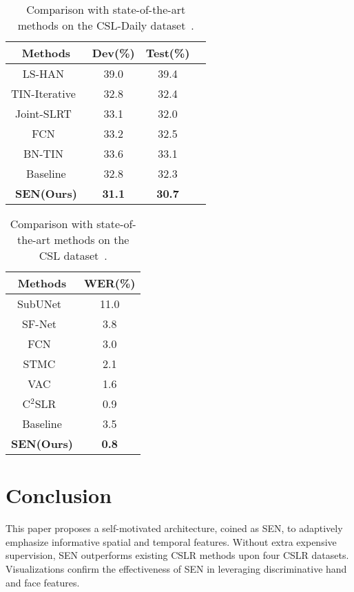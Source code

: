 \documentclass[letterpaper]{article} \usepackage{aaai23}  \usepackage{times}  \usepackage{helvet}  \usepackage{courier}  \usepackage[hyphens]{url}  \usepackage{graphicx} \urlstyle{rm} \def\UrlFont{\rm}  \usepackage{natbib}  \usepackage{caption} \frenchspacing  \setlength{\pdfpagewidth}{8.5in} \setlength{\pdfpageheight}{11in} \usepackage{algorithm}
\begin{document}
\begin{table}[t]   
  \centering
  \setlength\tabcolsep{2pt}
  \begin{tabular}{cccc}
  \hline
  Methods&  Dev(\%) & Test(\%)\\
  \hline
LS-HAN~\cite{huang2018video}  & 39.0  & 39.4\\
  TIN-Iterative~\cite{cui2019deep}  & 32.8  & 32.4\\
  Joint-SLRT~\cite{camgoz2020sign}  & 33.1  & 32.0 \\
  FCN~\cite{cheng2020fully} & 33.2  & 32.5 \\
  BN-TIN~\cite{zhou2021improving} & 33.6  & 33.1 \\
  \hline
  Baseline & 32.8 & 32.3\\
  \textbf{SEN(Ours)} & \textbf{31.1} & \textbf{30.7} \\
  \hline
  \end{tabular}  
  \caption{Comparison with state-of-the-art methods on the CSL-Daily dataset~\cite{zhou2021improving}.} 
  \label{tab8}
  \end{table}

\begin{table}[t]   
  \centering
  \setlength\tabcolsep{2pt}
  \begin{tabular}{cc}
    \hline
    Methods&  WER(\%)\\
    \hline
SubUNet~\cite{cihan2017subunets}   & 11.0\\
    SF-Net~\cite{yang2019sf} & 3.8 \\
    FCN~\cite{cheng2020fully}   & 3.0 \\
    STMC~\cite{zhou2020spatial}  & 2.1 \\
    VAC~\cite{Min_2021_ICCV} & 1.6 \\
    C$^2$SLR~\cite{zuo2022c2slr} & 0.9 \\
    \hline
    Baseline  & 3.5\\
    \textbf{SEN(Ours)} & \textbf{0.8} \\
    \hline
    \end{tabular}  
    \caption{Comparison with state-of-the-art methods on the CSL dataset~\cite{huang2018video}.} 
    \label{tab9}

  \end{table}

\section{Conclusion}
This paper proposes a self-motivated architecture, coined as SEN, to adaptively emphasize informative spatial and temporal features. Without extra expensive supervision, SEN outperforms existing CSLR methods upon four CSLR datasets. Visualizations confirm the effectiveness of SEN in leveraging discriminative hand and face features.

\end{document}

